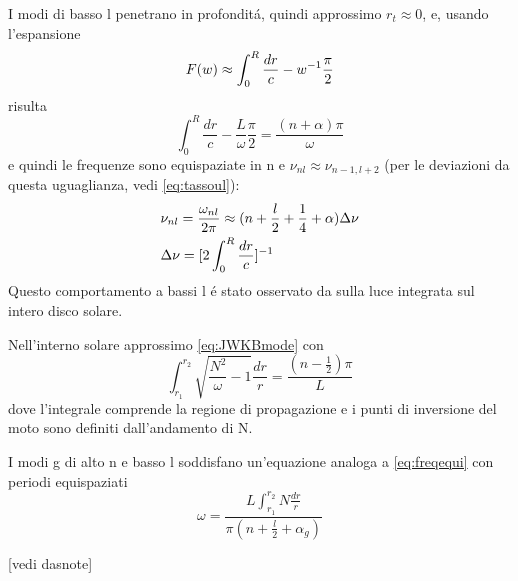 \documentclass[../main.tex]{subfiles}
\begin{document}
I modi di basso l penetrano in profondit\'a, quindi approssimo $r_t\approx0$, e, usando l'espansione
\begin{equation}
F(w)\approx\int_0^R\frac{dr}{c}-w^{-1}\frac{\pi}{2}
\end{equation}
 risulta
\begin{equation}
\int_0^R\frac{dr}{c}-\frac{L}{\omega}\frac{\pi}{2}=\frac{(n+\alpha)\pi}{\omega}
\end{equation}
e quindi le  frequenze sono equispaziate in n e $\nu_{nl}\approx\nu_{n-1,l+2}$ (per le deviazioni da questa uguaglianza, vedi \eqref{eq:tassoul}):
\begin{align}
&\nu_{nl}=\frac{\omega_{nl}}{2\pi}\approx(n+\frac{l}{2}+\frac{1}{4}+\alpha)\Delta\nu\label{eq:freqequi}\\
&\Delta\nu=[2\int_0^R\frac{dr}{c}]^{-1}
\end{align}
Questo comportamento a bassi l \'e stato osservato da \cite{cla79solar} sulla luce integrata sul intero disco solare.

\begin{workout}
Nell'interno solare approssimo \eqref{eq:JWKBmode} con
\begin{equation}
\int_{r_1}^{r_2}\sqrt{\frac{N^2}{\omega}-1}\frac{dr}{r}=\frac{(n-\frac{1}{2})\pi}{L}
\end{equation}
dove l'integrale comprende la regione di propagazione e i punti di inversione del moto sono definiti dall'andamento di N.

I modi g di alto n e basso l soddisfano un'equazione analoga a \eqref{eq:freqequi} con periodi equispaziati
\begin{equation}
\omega=\frac{L\int_{r_1}^{r_2}N\frac{dr}{r}}{\pi(n+\frac{l}{2}+\alpha_g)}
\end{equation}

[vedi dasnote]

\end{workout}

\end{document}
